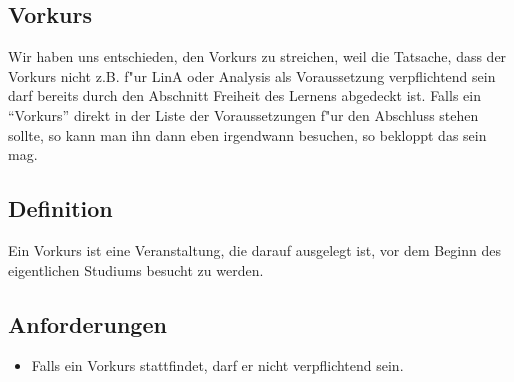 	\begin{kcmt}\begin{komacmt}

\section{Vorkurs}

	Wir haben uns entschieden, den Vorkurs zu streichen, weil die Tatsache, dass der Vorkurs nicht z.B. f"ur LinA oder Analysis als Voraussetzung verpflichtend sein darf bereits durch den Abschnitt Freiheit des Lernens abgedeckt ist.
	Falls ein ``Vorkurs'' direkt in der Liste der Voraussetzungen f"ur den Abschluss stehen sollte, so kann man ihn dann eben irgendwann besuchen, so bekloppt das sein mag.

\subsection{Definition}
Ein Vorkurs ist eine Veranstaltung, die darauf ausgelegt ist, vor dem Beginn des eigentlichen Studiums besucht zu werden.

\subsection{Anforderungen}
\begin{itemize}
\item Falls ein Vorkurs stattfindet, darf er nicht verpflichtend sein.
\end{itemize}

	\end{komacmt}\end{kcmt}
